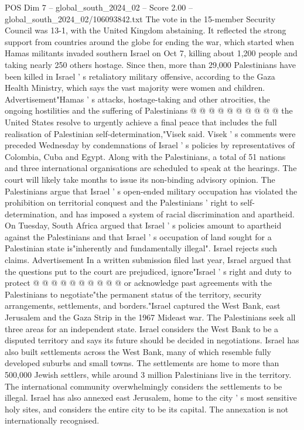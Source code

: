 \begin{textsample}{POS Dim 7 – global\_south\_2024\_02 – Score 2.00 – global\_south\_2024\_02/106093842.txt}
The vote in the 15-member Security Council was 13-1, with the United Kingdom abstaining.
It reflected the strong support from countries around the globe for ending the war, which started when Hamas militants invaded southern Israel on Oct 7, killing about 1,200 people and taking nearly 250 others hostage.
Since then, more than 29,000 Palestinians have been killed in Israel ' s retaliatory military offensive, according to the Gaza Health Ministry, which says the vast majority were women and children.
Advertisement"Hamas ' s attacks, hostage-taking and other atrocities, the ongoing hostilities and the suffering of Palestinians @ @ @ @ @ @ @ @ @ @ the United States resolve to urgently achieve a final peace that includes the full realisation of Palestinian self-determination,"Visek said.
Visek ' s comments were preceded Wednesday by condemnations of Israel ' s policies by representatives of Colombia, Cuba and Egypt.
Along with the Palestinians, a total of 51 nations and three international organisations are scheduled to speak at the hearings.
The court will likely take months to issue its non-binding advisory opinion.
The Palestinians argue that Israel ' s open-ended military occupation has violated the prohibition on territorial conquest and the Palestinians ' right to self-determination, and has imposed a system of racial discrimination and apartheid.
On Tuesday, South Africa argued that Israel ' s policies amount to apartheid against the Palestinians and that Israel ' s occupation of land sought for a Palestinian state is"inherently and fundamentally illegal".
Israel rejects such claims.
Advertisement In a written submission filed last year, Israel argued that the questions put to the court are prejudiced, ignore"Israel ' s right and duty to protect @ @ @ @ @ @ @ @ @ @ or acknowledge past agreements with the Palestinians to negotiate"the permanent status of the territory, security arrangements, settlements, and borders."Israel captured the West Bank, east Jerusalem and the Gaza Strip in the 1967 Mideast war.
The Palestinians seek all three areas for an independent state.
Israel considers the West Bank to be a disputed territory and says its future should be decided in negotiations.
Israel has also built settlements across the West Bank, many of which resemble fully developed suburbs and small towns.
The settlements are home to more than 500,000 Jewish settlers, while around 3 million Palestinians live in the territory.
The international community overwhelmingly considers the settlements to be illegal.
Israel has also annexed east Jerusalem, home to the city ' s most sensitive holy sites, and considers the entire city to be its capital.
The annexation is not internationally recognised.

\end{textsample}
